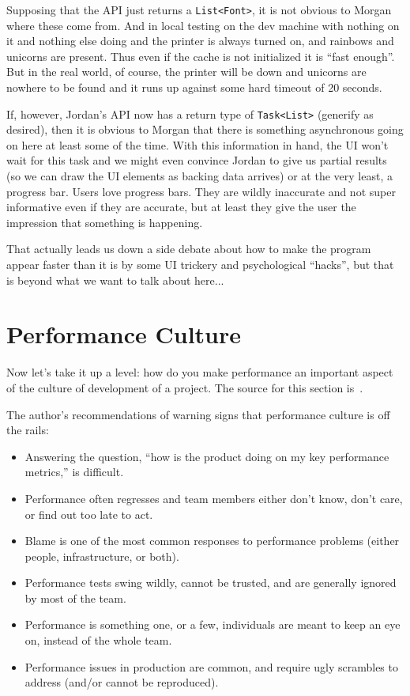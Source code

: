 \documentclass[a4paper]{report}
\begin{document}
Supposing that the API just returns a \texttt{List<Font>}, it is not obvious to Morgan where these come from. And in local testing on the dev machine with nothing on it and nothing else doing and the printer is always turned on, and rainbows and unicorns are present. Thus even if the cache is not initialized it is ``fast enough''. But in the real world, of course, the printer will be down and unicorns are nowhere to be found and it runs up against some hard timeout of 20 seconds. 

If, however, Jordan's API now has a return type of \texttt{Task<List>} (generify as desired), then it is obvious to Morgan that there is something asynchronous going on here at least some of the time. With this information in hand, the UI won't wait for this task and we might even convince Jordan to give us partial results (so we can draw the UI elements as backing data arrives) or at the very least, a progress bar. Users love progress bars. They are wildly inaccurate and not super informative even if they are accurate, but at least they give the user the impression that something is happening.

That actually leads us down a side debate about how to make the program appear faster than it is by some UI trickery and psychological ``hacks'', but that is beyond what we want to talk about here...

\section*{Performance Culture}

Now let's take it up a level: how do you make performance an important aspect of the culture of development of a project. The source for this section is~\cite{perfculture}.

The author's recommendations of warning signs that performance culture is off the rails:

\begin{itemize}
\item Answering the question, ``how is the product doing on my key performance metrics,'' is difficult.
\item Performance often regresses and team members either don't know, don't care, or find out too late to act.
\item Blame is one of the most common responses to performance problems (either people, infrastructure, or both).
\item Performance tests swing wildly, cannot be trusted, and are generally ignored by most of the team.
\item Performance is something one, or a few, individuals are meant to keep an eye on, instead of the whole team.
\item Performance issues in production are common, and require ugly scrambles to address (and/or cannot be reproduced).
\end{itemize}
\end{document}
